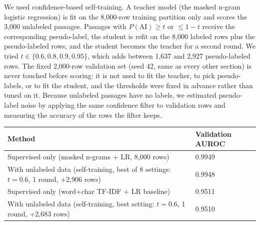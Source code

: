 
We used confidence-based self-training. A teacher model (the masked n-gram logistic regression) is fit on the 8{,}000-row training partition only and scores the 3{,}000 unlabeled passages. Passages with $P(\text{AI}) \geq t$ or $\leq 1-t$ receive the corresponding pseudo-label, the student is refit on the 8{,}000 labeled rows plus the pseudo-labeled rows, and the student becomes the teacher for a second round. We tried $t \in \{0.6, 0.8, 0.9, 0.95\}$, which adds between 1{,}637 and 2{,}927 pseudo-labeled rows. The fixed 2{,}000-row validation set (seed 42, same as every other section) is never touched before scoring: it is not used to fit the teacher, to pick pseudo-labels, or to fit the student, and the thresholds were fixed in advance rather than tuned on it. Because unlabeled passages have no labels, we estimated pseudo-label noise by applying the same confidence filter to validation rows and measuring the accuracy of the rows the filter keeps.

\begin{tabularx}{\linewidth}{@{}Yp{1.5in}@{}}\toprule Method & Validation AUROC \\ \midrule
Supervised only (masked n-grams + LR, 8{,}000 rows) & 0.9949 \\
With unlabeled data (self-training, best of 8 settings: $t=0.6$, 1 round, +2{,}906 rows) & 0.9948 \\
\midrule
Supervised only (word+char TF-IDF + LR baseline) & 0.9511 \\
With unlabeled data (self-training, best setting: $t=0.6$, 1 round, +2{,}683 rows) & 0.9510 \\
\bottomrule\end{tabularx}

